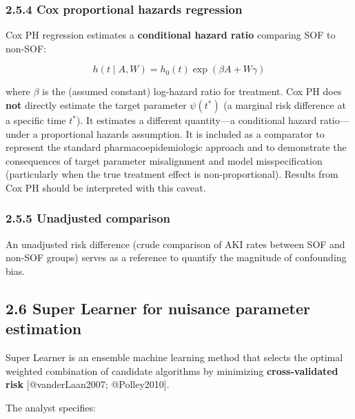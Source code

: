 \documentclass[
  letterpaper,
  DIV=11,
  numbers=noendperiod]{scrartcl}
\begin{document}
\subsubsection{2.5.4 Cox proportional hazards
regression}\label{cox-proportional-hazards-regression}

Cox PH regression estimates a \textbf{conditional hazard ratio}
comparing SOF to non-SOF:

\[h(t \mid A, W) = h_0(t) \exp(\beta A + W\gamma)\]

where \(\beta\) is the (assumed constant) log-hazard ratio for
treatment. Cox PH does \textbf{not} directly estimate the target
parameter \(\psi(t^*)\) (a marginal risk difference at a specific time
\(t^*\)). It estimates a different quantity---a conditional hazard
ratio---under a proportional hazards assumption. It is included as a
comparator to represent the standard pharmacoepidemiologic approach and
to demonstrate the consequences of target parameter misalignment and
model misspecification (particularly when the true treatment effect is
non-proportional). Results from Cox PH should be interpreted with this
caveat.

\subsubsection{2.5.5 Unadjusted comparison}\label{unadjusted-comparison}

An unadjusted risk difference (crude comparison of AKI rates between SOF
and non-SOF groups) serves as a reference to quantify the magnitude of
confounding bias.

\subsection{2.6 Super Learner for nuisance parameter
estimation}\label{super-learner-for-nuisance-parameter-estimation}

Super Learner is an ensemble machine learning method that selects the
optimal weighted combination of candidate algorithms by minimizing
\textbf{cross-validated risk} {[}@vanderLaan2007; @Polley2010{]}.

The analyst specifies:
\end{document}

